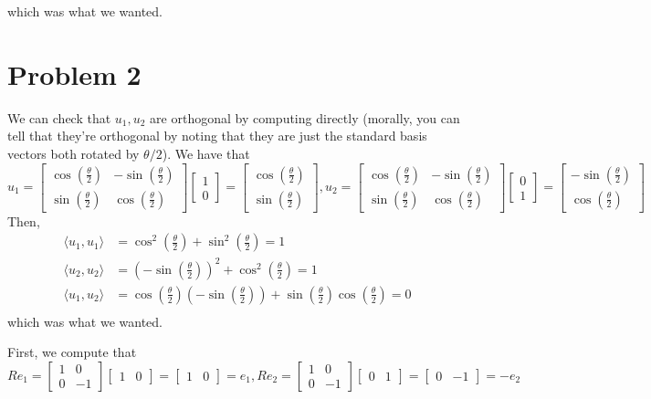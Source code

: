 \documentclass[12pt,letterpaper]{article}
\theoremstyle{definition}
\begin{document}
which was what we wanted.

\section*{Problem 2}

We can check that $u_1, u_2$ are orthogonal by computing directly (morally, you can tell that they're orthogonal by noting that they are just the standard basis vectors both rotated by $\theta / 2$). We have that
\[
  u_1 = \begin{bmatrix} \cos(\frac{\theta}{2}) & -\sin(\frac{\theta}{2}) \\ \sin(\frac{\theta}{2}) & \cos(\frac{\theta}{2}) \end{bmatrix}\begin{bmatrix}1 \\ 0 \end{bmatrix} = \begin{bmatrix} \cos(\frac{\theta}{2}) \\ \sin(\frac{\theta}{2}) \end{bmatrix}, u_2 = \begin{bmatrix} \cos(\frac{\theta}{2}) & -\sin(\frac{\theta}{2}) \\ \sin(\frac{\theta}{2}) & \cos(\frac{\theta}{2}) \end{bmatrix}\begin{bmatrix} 0 \\ 1 \end{bmatrix} = \begin{bmatrix} -\sin(\frac{\theta}{2}) \\ \cos(\frac{\theta}{2}) \end{bmatrix}
\]
Then,
\begin{align*}
  \langle u_1, u_1 \rangle &= \cos^2\left(\frac{\theta}{2}\right) + \sin^2\left(\frac{\theta}{2}\right) = 1 \\
  \langle u_2, u_2 \rangle &= \left(-\sin\left(\frac{\theta}{2}\right)\right)^2 + \cos^2\left(\frac{\theta}{2}\right) = 1 \\
  \langle u_1, u_2 \rangle &= \cos\left(\frac{\theta}{2}\right)\left(-\sin\left(\frac{\theta}{2}\right)\right) + \sin\left(\frac{\theta}{2}\right)\cos\left(\frac{\theta}{2}\right) = 0 \\
\end{align*}
which was what we wanted.

First, we compute that
\[
  Re_1 = \begin{bmatrix} 1 & 0 \\ 0 & -1 \end{bmatrix}\begin{bmatrix}1 & 0\end{bmatrix} = \begin{bmatrix}1 & 0\end{bmatrix} = e_1, Re_2 = \begin{bmatrix} 1 & 0 \\ 0 & -1 \end{bmatrix}\begin{bmatrix}0 & 1\end{bmatrix} = \begin{bmatrix}0 & -1\end{bmatrix} = -e_2
\]
\end{document}
